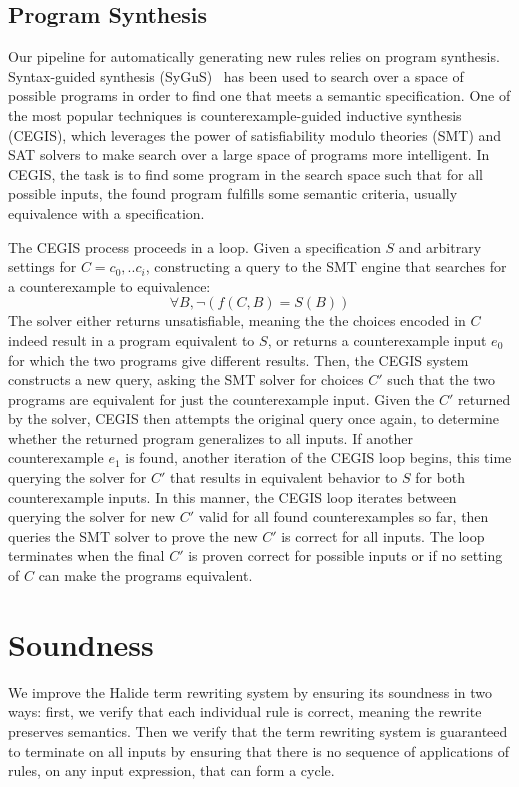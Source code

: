 \documentclass[sigplan,10pt,review,anonymous]{acmart}\settopmatter{printfolios=true,printccs=false,printacmref=false}
\begin{document}
\subsection{Program Synthesis}
Our pipeline for automatically generating new rules relies on program synthesis.
Syntax-guided synthesis (SyGuS)~\cite{sygus} has been used
to search over a space of possible programs in order to find one that meets
a semantic specification.  One of the most popular techniques is counterexample-guided
inductive synthesis (CEGIS), which leverages the power of satisfiability modulo theories
(SMT) and SAT solvers to make search over a large space of programs more intelligent.
In CEGIS, the task is to find some program in the search space such that for all possible
inputs, the found program fulfills some semantic criteria, usually equivalence with
a specification.

The CEGIS process proceeds in a loop. Given a specification $S$ and arbitrary
settings for $C = {c_0,..c_i}$, constructing a query to the SMT engine that searches for
a counterexample to equivalence:
$$\forall B, \neg (f(C, B) = S(B))$$
The solver either returns unsatisfiable, meaning the the choices encoded in $C$
indeed result in a program equivalent to $S$, or returns a counterexample input $e_0$
for which the two programs give different results.  Then, the CEGIS system constructs a new query,
asking the SMT solver for choices $C'$ such that the two programs are equivalent for just the
counterexample input.
Given the $C'$ returned by the solver, CEGIS then attempts the original query once again, to
determine whether the returned program generalizes to all inputs.
If another counterexample $e_1$ is found, another iteration of the CEGIS loop begins, this time querying
the solver for $C'$ that results in equivalent behavior to $S$ for both counterexample inputs.
In this manner, the CEGIS loop iterates between querying the solver for new $C'$ valid
for all found counterexamples so far, then queries the SMT solver to prove the new $C'$ is
correct for all inputs.  The loop terminates when the final $C'$ is proven correct for
possible inputs or if no setting of $C$ can make the programs equivalent.

\section{Soundness}
\label{sec:soundness}

We improve the Halide term rewriting system by ensuring its soundness in
two ways: first, we verify that each individual rule is correct, meaning the
rewrite preserves semantics. Then we verify that the term rewriting system is
guaranteed to terminate on all inputs by ensuring that there is no sequence of
applications of rules, on any input expression, that can form a cycle.
\end{document}
